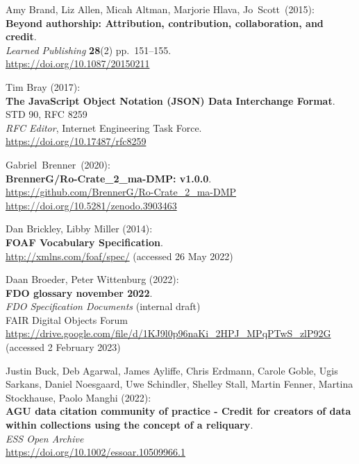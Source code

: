 \begin{thebibliography}{9}
Amy Brand, Liz Allen, Micah Altman, Marjorie Hlava, Jo~Scott~(2015):\\
\textbf{Beyond authorship: Attribution, contribution, collaboration, and
credit}.\\
\emph{Learned Publishing} \textbf{28}(2) pp.~151--155.\\
\url{https://doi.org/10.1087/20150211}

Tim Bray (2017):\\
\textbf{The JavaScript Object Notation (JSON) Data
Interchange Format}.\\
STD 90, RFC 8259\\
\emph{RFC Editor}, 
Internet Engineering Task Force.\\
\url{https://doi.org/10.17487/rfc8259}

Gabriel~Brenner~(2020):\\
\textbf{BrennerG/Ro-Crate\_2\_ma-DMP: v1.0.0}.\\
\url{https://github.com/BrennerG/Ro-Crate_2_ma-DMP}\\
\url{https://doi.org/10.5281/zenodo.3903463}

Dan Brickley, Libby Miller (2014): \\
\textbf{FOAF Vocabulary Specification}.\\
\url{http://xmlns.com/foaf/spec/} (accessed 26 May 2022)

Daan Broeder, Peter Wittenburg (2022): \\
\textbf{{FDO} glossary november 2022}.\\
\emph{FDO Specification Documents} (internal draft)\\
FAIR Digital Objects Forum
\url{https://drive.google.com/file/d/1KJ9l0p96naKi_2HPJ_MPqPTwS_zlP92G}
(accessed 2 February 2023)

Justin Buck, Deb Agarwal, James Ayliffe, Chris Erdmann, Carole Goble, Ugis Sarkans, Daniel Noesgaard, Uwe Schindler, Shelley Stall, Martin Fenner, Martina Stockhause, Paolo Manghi (2022):\\
\textbf{AGU data citation community of practice - Credit for creators of data within collections using the concept of a reliquary}.\\ 
\emph{ESS Open Archive}\\
\url{https://doi.org/10.1002/essoar.10509966.1}



\end{thebibliography}
